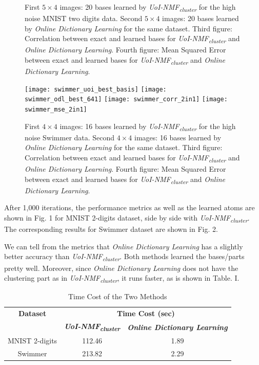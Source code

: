 \documentclass[conference]{IEEEtran}
\begin{document}
\begin{figure}[!htb]
\endminipage
\caption{First $5\times 4$ images: 20 bases learned by \textit{UoI-NMF\textsubscript{cluster}} for the high noise MNIST two digits data. Second $5\times 4$ images: 20 bases learned by \textit{Online Dictionary Learning} for the same dataset. Third figure: Correlation between exact and learned bases for \textit{UoI-NMF\textsubscript{cluster}} and \textit{Online Dictionary Learning}. Fourth figure: Mean Squared Error between exact and learned bases for \textit{UoI-NMF\textsubscript{cluster}} and \textit{Online Dictionary Learning}. }\label{fig:mnist_4}
\end{figure}

\begin{figure}[!htb]
\centering
{}
  \texttt{[image: swimmer\_uoi\_best\_basis]}
\endminipage\hfill
{}
  \texttt{[image: swimmer\_odl\_best\_641]}
\endminipage\hfill
{}%
  \texttt{[image: swimmer\_corr\_2in1]}
\endminipage
{}%
  \texttt{[image: swimmer\_mse\_2in1]}
\endminipage
\caption{First $4\times 4$ images: 16 bases learned by \textit{UoI-NMF\textsubscript{cluster}} for the
high noise Swimmer data. Second $4\times 4$ images: 16 bases learned by \textit{Online Dictionary Learning} for the same dataset. Third figure: Correlation between exact and learned bases for \textit{UoI-NMF\textsubscript{cluster}} and \textit{Online Dictionary Learning}. Fourth figure: Mean Squared Error between exact and learned bases for \textit{UoI-NMF\textsubscript{cluster}} and \textit{Online Dictionary Learning}. }\label{fig:swimmer_4}
\end{figure}

After 1,000 iterations, the performance metrics as well as the learned atoms are shown in Fig. 1 for MNIST 2-digits dataset, side by side with \textit{UoI-NMF\textsubscript{cluster}}. The corresponding results for Swimmer dataset are shown in Fig. 2.

We can tell from the metrics that \textit{Online Dictionary Learning} has a slightly better accuracy than \textit{UoI-NMF\textsubscript{cluster}}. Both methods learned the bases/parts pretty well. Moreover, since \textit{Online Dictionary Learning} does not have the clustering part as in \textit{UoI-NMF\textsubscript{cluster}}, it runs faster, as is shown in Table. I.

\begin{table}[htbp]
\caption{Time Cost of the Two Methods}
\begin{center}
\begin{tabular}{|c|c|c|}
\hline
\textbf{Dataset}&\multicolumn{2}{|c|}{\textbf{Time Cost (sec)}} \\
\cline{2-3}
 & \textbf{\textit{UoI-NMF\textsubscript{cluster}}}& \textbf{\textit{Online Dictionary Learning}} \\
\hline
MNIST 2-digits & 112.46 & 1.89 \\
\hline
Swimmer & 213.82 & 2.29 \\
\hline
\end{tabular}
\label{tab1}
\end{center}
\end{table}
\end{document}
